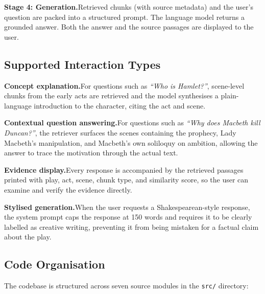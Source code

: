 \documentclass[10pt,conference]{IEEEtran}
\begin{document}
\medskip\noindent\textbf{Stage 4: Generation.}\enspace Retrieved
chunks (with source metadata) and the user's question are packed into
a structured prompt. The language model returns a grounded answer.
Both the answer and the source passages are displayed to the user.

\subsection{Supported Interaction Types}

\medskip\noindent\textbf{Concept explanation.}\enspace For questions
such as \textit{``Who is Hamlet?''}, scene-level chunks from the early
acts are retrieved and the model synthesises a plain-language
introduction to the character, citing the act and scene.

\medskip\noindent\textbf{Contextual question answering.}\enspace For
questions such as \textit{``Why does Macbeth kill Duncan?''}, the
retriever surfaces the scenes containing the prophecy, Lady Macbeth's
manipulation, and Macbeth's own soliloquy on ambition, allowing the
answer to trace the motivation through the actual text.

\medskip\noindent\textbf{Evidence display.}\enspace Every response is
accompanied by the retrieved passages printed with play, act, scene,
chunk type, and similarity score, so the user can examine and verify
the evidence directly.

\medskip\noindent\textbf{Stylised generation.}\enspace When the user
requests a Shakespearean-style response, the system prompt caps the
response at 150 words and requires it to be clearly labelled as
creative writing, preventing it from being mistaken for a factual
claim about the play.

\subsection{Code Organisation}

The codebase is structured across seven source modules in the
\texttt{src/} directory:
\end{document}
